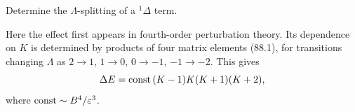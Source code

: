 \ProblemHeading Determine the $\Lambda$-splitting of a ${}^1\Delta$ term.

\SolutionHeading Here the effect first appears in fourth-order perturbation theory. Its dependence on $K$ is determined by products of four matrix elements (88.1), for transitions changing $\Lambda$ as $2\to1$, $1\to0$, $0\to-1$, $-1\to-2$. This gives
\[
\Delta E=\mathop{\rm const}\nolimits\,(K-1)K(K+1)(K+2),
\]
where $\mathop{\rm const}\nolimits\sim B^4/\varepsilon^3$.

